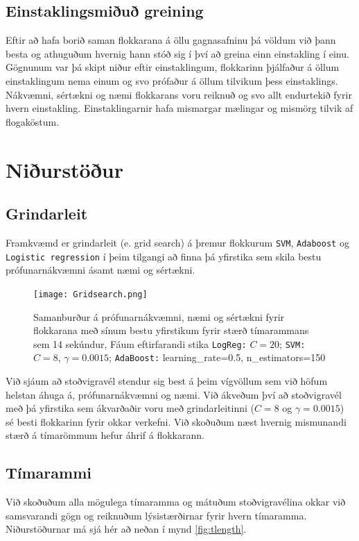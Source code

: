\documentclass[11pt]{article}
\begin{document}
\subsection{Einstaklingsmiðuð greining}
Eftir að hafa borið saman flokkarana á öllu gagnasafninu þá völdum við þann besta og athuguðum hvernig hann stóð sig í því að greina einn einstakling í einu. Gögnunum var þá skipt niður eftir einstaklingum, flokkarinn þjálfaður á öllum einstaklingum nema einum og svo prófaður á öllum tilvikum þess einstaklings. Nákvæmni, sértækni og næmi flokkarans voru reiknuð og svo allt endurtekið fyrir hvern einstakling. Einstaklingarnir hafa mismargar mælingar og mismörg tilvik af flogaköstum. 
\section{Niðurstöður}

\subsection{Grindarleit}
Framkvæmd er grindarleit (e. grid search) á þremur flokkurum {\tt SVM}, {\tt Adaboost} og {\tt Logistic regression} í þeim tilgangi að finna þá yfirstika sem skila bestu prófunarnákvæmni ásamt næmi og sértækni.
\label{ch:grindarleit}
\begin{figure}[H]
    \centering
    \texttt{[image: Gridsearch.png]}
    \caption{Samanburður á prófunarnákvæmni, næmi og sértækni fyrir flokkarana með sínum bestu yfirstikum fyrir stærð tímarammans sem 14 sekúndur, Fáum eftirfarandi stika {\tt LogReg:} $C=20$; {\tt SVM:} $C=8$, $\gamma = 0.0015$; {\tt AdaBoost:} learning\_rate=0.5, n\_estimators=150} 
    \label{fig:Gridsearch}
\end{figure}

Við sjáum að stoðvigravél stendur sig best á þeim vígvöllum sem við höfum helstan áhuga á, prófunarnákvæmni og næmi. Við ákveðum því að stoðvigravél með þá yfirstika sem ákvarðaðir voru með grindarleitinni ($C = 8$ og $\gamma = 0.0015$) sé besti flokkarinn fyrir okkar verkefni. Við skoðuðum næst hvernig mismunandi stærð á tímarömmum hefur áhrif á flokkarann.
\subsection{Tímarammi}
Við skoðuðum alla mögulega tímaramma og mátuðum stoðvigravélina okkar við samsvarandi gögn og reiknuðum lýsistærðirnar fyrir hvern tímaramma. Niðurstöðurnar má sjá hér að neðan í mynd \ref{fig:tlength}.
\end{document}
